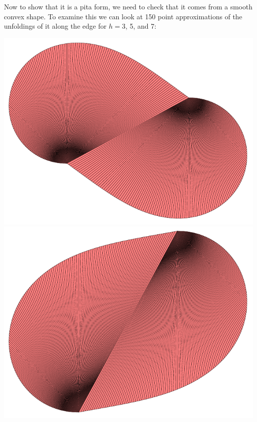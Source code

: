\documentclass[12pt]{article}
\begin{document}
Now to show that it is a pita form, we need to check that it comes from a smooth convex shape. To examine this we can look at 150 point approximations of the unfoldings of it along the edge for $h=3$, 5, and 7:
\begin{center}
\includegraphics[scale=.4]{unfold_h=3_n=150.pdf}
\includegraphics[scale=.4]{unfold_h=5_n=150.pdf}

\end{center}
\end{document}
